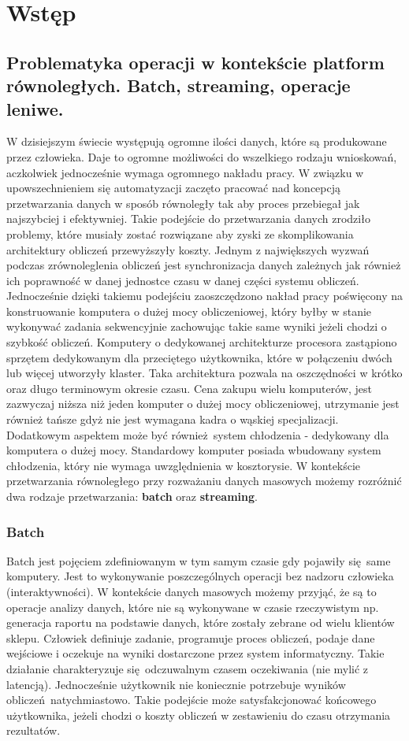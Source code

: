 \chapter{Wstęp} \label{chap.introduction}


\section{Problematyka operacji w kontekście platform równoległych. Batch, streaming, operacje leniwe.}
W dzisiejszym świecie występują ogromne ilości danych, które są produkowane przez człowieka. Daje to ogromne możliwości do wszelkiego rodzaju wnioskowań, aczkolwiek jednocześnie wymaga ogromnego nakładu pracy. W związku w upowszechnieniem się automatyzacji zaczęto pracować nad koncepcją przetwarzania danych w sposób równoległy tak aby proces przebiegał jak najszybciej i efektywniej. Takie podejście do przetwarzania danych zrodziło problemy, które musiały zostać rozwiązane aby zyski ze skomplikowania architektury obliczeń przewyższyły koszty. Jednym z największych wyzwań podczas zrównoleglenia obliczeń jest synchronizacja danych zależnych jak również ich poprawność w danej jednostce czasu w danej części systemu obliczeń. Jednocześnie dzięki takiemu podejściu zaoszczędzono nakład pracy poświęcony na konstruowanie komputera o dużej mocy obliczeniowej, który byłby w stanie wykonywać zadania sekwencyjnie zachowując takie same wyniki jeżeli chodzi o szybkość obliczeń. Komputery o dedykowanej architekturze procesora zastąpiono sprzętem dedykowanym dla przeciętego użytkownika, które w połączeniu dwóch lub więcej utworzyły klaster. Taka architektura pozwala na oszczędności w krótko oraz długo terminowym okresie czasu. Cena zakupu wielu komputerów, jest zazwyczaj niższa niż jeden komputer o dużej mocy obliczeniowej, utrzymanie jest również tańsze gdyż nie jest wymagana kadra o wąskiej specjalizacji. Dodatkowym aspektem może być również system chłodzenia - dedykowany dla komputera o dużej mocy. Standardowy komputer posiada wbudowany system chłodzenia, który nie wymaga uwzględnienia w kosztorysie. W kontekście przetwarzania równoległego przy rozważaniu danych masowych możemy rozróżnić dwa rodzaje przetwarzania: \textbf{batch} oraz \textbf{streaming}.
\subsection{Batch}\label{batch_subsection} 
Batch jest pojęciem zdefiniowanym w tym samym czasie gdy pojawiły się same komputery. Jest to wykonywanie poszczególnych operacji bez nadzoru człowieka (interaktywności). W kontekście danych masowych możemy przyjąć, że są to operacje analizy danych, które nie są wykonywane w czasie rzeczywistym np. generacja raportu na podstawie danych, które zostały zebrane od wielu klientów sklepu. Człowiek definiuje zadanie, programuje proces obliczeń, podaje dane wejściowe i oczekuje na wyniki dostarczone przez system informatyczny. Takie działanie charakteryzuje się odczuwalnym czasem oczekiwania (nie mylić z latencją). Jednocześnie użytkownik nie koniecznie potrzebuje wyników obliczeń natychmiastowo. Takie podejście może satysfakcjonować końcowego użytkownika, jeżeli chodzi o koszty obliczeń w zestawieniu do czasu otrzymania rezultatów.
